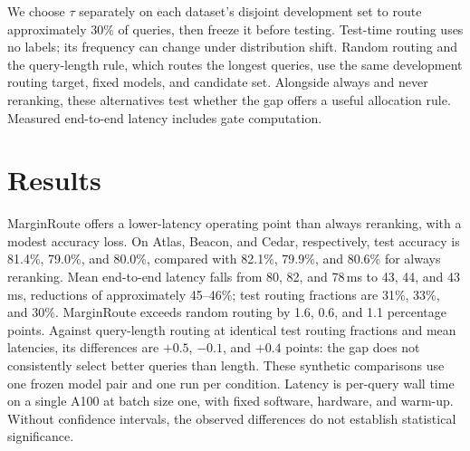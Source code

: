 \documentclass[11pt]{article}
\begin{document}
We choose $\tau$ separately on each dataset's disjoint development set to route approximately 30\% of queries, then freeze it before testing. Test-time routing uses no labels; its frequency can change under distribution shift. Random routing and the query-length rule, which routes the longest queries, use the same development routing target, fixed models, and candidate set. Alongside always and never reranking, these alternatives test whether the gap offers a useful allocation rule. Measured end-to-end latency includes gate computation.

\section{Results}
\label{sec:results}

MarginRoute offers a lower-latency operating point than always reranking, with a modest accuracy loss. On Atlas, Beacon, and Cedar, respectively, test accuracy is 81.4\%, 79.0\%, and 80.0\%, compared with 82.1\%, 79.9\%, and 80.6\% for always reranking. Mean end-to-end latency falls from 80, 82, and 78\,ms to 43, 44, and 43\,ms, reductions of approximately 45--46\%; test routing fractions are 31\%, 33\%, and 30\%. MarginRoute exceeds random routing by 1.6, 0.6, and 1.1 percentage points. Against query-length routing at identical test routing fractions and mean latencies, its differences are $+0.5$, $-0.1$, and $+0.4$ points: the gap does not consistently select better queries than length. These synthetic comparisons use one frozen model pair and one run per condition. Latency is per-query wall time on a single A100 at batch size one, with fixed software, hardware, and warm-up. Without confidence intervals, the observed differences do not establish statistical significance.
\end{document}
